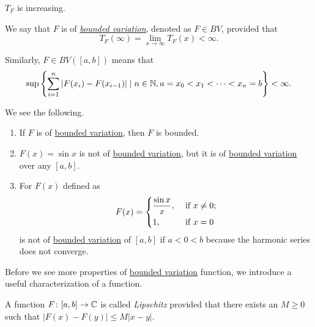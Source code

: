\begin{remark}
	\(T_F\) is increasing.
\end{remark}

\begin{definition}\label{def:bounded-variation}
	We say that \(F\) is of \emph{\hyperref[def:bounded-variation]{bounded variation}}, denoted as \(F \in BV\), provided that
	\[
		T_F(\infty) = \lim_{x \to \infty} T_F(x) < \infty.
	\]

	Similarly, \(F \in BV([a,b])\) means that
	\[
		\sup \left\{\sum_{i=1}^n \left\vert F(x_i) - F(x_{i-1}) \right\vert \mid n \in \mathbb{\MakeUppercase{n}} , a = x_0 < x_1 < \cdots < x_n = b\right\} < \infty.
	\]
\end{definition}

\begin{remark}
	We see the following.
	\begin{enumerate}
		\item If \(F\) is of \hyperref[def:bounded-variation]{bounded variation}, then \(F\) is bounded.
		\item \(F(x) = \sin x\) is not of \hyperref[def:bounded-variation]{bounded variation}, but it is of \hyperref[def:bounded-variation]{bounded variation}
		      over any $[a,b]$.
		\item For \(F(x)\) defined as
		      \[
			      F(x) = \begin{dcases}
				      \frac{\sin x}{x}, & \text{ if } x\neq 0 ; \\
				      1,                & \text{ if } x = 0
			      \end{dcases}
		      \]
		      is not of \hyperref[def:bounded-variation]{bounded variation} of \([a,b]\) if \(a < 0 < b\) because the harmonic series does not converge.
	\end{enumerate}
\end{remark}

Before we see more properties of \hyperref[def:bounded-variation]{bounded variation} function, we introduce a useful characterization of a function.
\begin{definition}[Lipschitz]\label{def:Lipschitz}
	A function \(F \colon [a,b] \to \mathbb{\MakeUppercase{c}} \) is called \emph{Lipschitz} provided that there exists an
	\(M \geq 0\) such that \(\left\vert F(x) - F(y) \right\vert \leq M \left\vert x - y \right\vert\).
\end{definition}


